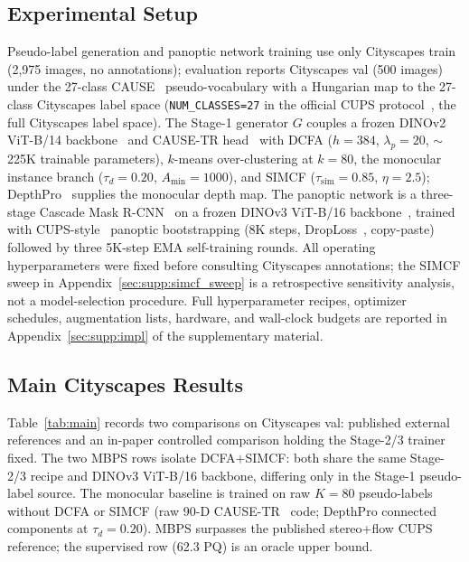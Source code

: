 \documentclass{article}
\begin{document}
\subsection{Experimental Setup}
\label{sec:exp:setup}

Pseudo-label generation and panoptic network training use only Cityscapes train~\cite{cordts2016cityscapes} (2{,}975 images, no annotations); evaluation reports Cityscapes val (500 images) under the 27-class CAUSE~\cite{kim2024cause} pseudo-vocabulary with a Hungarian map to the 27-class Cityscapes label space (\texttt{NUM\_CLASSES=27} in the official CUPS protocol~\cite{hahn2025cups}, the full Cityscapes label space). The Stage-1 generator $G$ couples a frozen DINOv2 ViT-B/14 backbone~\cite{oquab2024dinov2} and CAUSE-TR head~\cite{kim2024cause} with DCFA ($h{=}384$, $\lambda_p{=}20$, $\sim$225K trainable parameters), $k$-means over-clustering at $k{=}80$, the monocular instance branch ($\tau_d{=}0.20$, $A_\text{min}{=}1000$), and SIMCF ($\tau_\text{sim}{=}0.85$, $\eta{=}2.5$); DepthPro~\cite{bochkovskii2024depthpro} supplies the monocular depth map. The panoptic network is a three-stage Cascade Mask R-CNN~\cite{cai2018cascade} on a frozen DINOv3 ViT-B/16 backbone~\cite{simeoni2025dinov3}, trained with CUPS-style~\cite{hahn2025cups} panoptic bootstrapping (8K steps, DropLoss~\cite{wang2023cutler}, copy-paste) followed by three 5K-step EMA self-training rounds. All operating hyperparameters were fixed before consulting Cityscapes annotations; the SIMCF sweep in Appendix~\ref{sec:supp:simcf_sweep} is a retrospective sensitivity analysis, not a model-selection procedure. Full hyperparameter recipes, optimizer schedules, augmentation lists, hardware, and wall-clock budgets are reported in Appendix~\ref{sec:supp:impl} of the supplementary material.


\subsection{Main Cityscapes Results}
\label{sec:exp:main}

Table~\ref{tab:main} records two comparisons on Cityscapes val: published external references and an in-paper controlled comparison holding the Stage-2/3 trainer fixed. The two MBPS rows isolate DCFA$+$SIMCF: both share the same Stage-2/3 recipe and DINOv3 ViT-B/16 backbone, differing only in the Stage-1 pseudo-label source. The monocular baseline is trained on raw $K{=}80$ pseudo-labels without DCFA or SIMCF (raw 90-D CAUSE-TR~\cite{kim2024cause} code; DepthPro connected components at $\tau_d{=}0.20$). MBPS surpasses the published stereo+flow CUPS reference; the supervised row (62.3 PQ) is an oracle upper bound.
\end{document}
